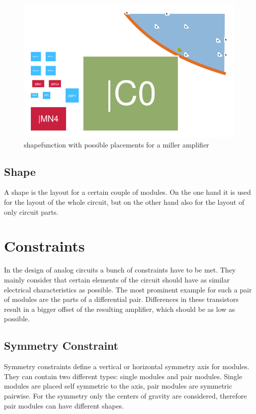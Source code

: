 \begin{figure}
	\centering
	\includegraphics[scale=1.8]{FIG/shapefunction.png}
	\caption{shapefunction with possible placements for a miller amplifier}
	\label{fig:shapefunction}
\end{figure}

\subsection{Shape}
A shape is the layout for a certain couple of modules. On the one hand it is used for the layout of the whole circuit, but on the other hand also for the layout of only circuit parts.

\section{Constraints}
In the design of analog circuits a bunch of constraints have to be met. They mainly consider that certain elements of the circuit should have as similar electrical characteristics as possible. The most prominent example for such a pair of modules are the parts of a differential pair. Differences in these transistors result in a bigger offset of the resulting amplifier, which should be as low as possible.

\subsection{Symmetry Constraint}
Symmetry constraints define a vertical or horizontal symmetry axis for modules. They can contain two different types: single modules and pair modules. Single modules are placed self symmetric to the axis, pair modules are symmetric pairwise. For the symmetry only the centers of gravity are considered, therefore pair modules can have different shapes. 

